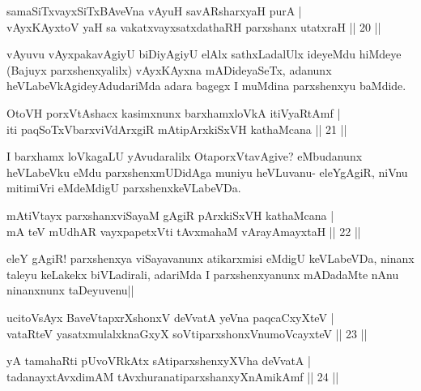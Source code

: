 
\begin{shl}
samaSiTxvayxSiTxBAveVna vAyuH savARsharxyaH purA |\\
vAyxKAyxtoV yaH sa vakatxvayxsatxdathaRH parxshanx utatxraH \hfill || 20 ||
\end{shl}

\begin{artha}
vAyuvu vAyxpakavAgiyU biDiyAgiyU elAlx sathxLadalUlx ideyeMdu hiMdeye (Bajuyx parxshenxyalilx) vAyxKAyxna mADideyaSeTx, adanunx heVLabeVkAgideyA\-dudariMda adara bagegx I muMdina parxshenxyu baMdide.
\end{artha}

\begin{shl}
OtoVH porxVtAshacx kasimxnunx barxhamxloVkA itiVyaRtAmf |\\
iti paqSoTxV\s barxviVdArxgiR mA\s tipArxkiSxVH kathaMcana \hfill || 21 ||
\end{shl}

\begin{artha}
I barxhamx loVkagaLU yAvudaralilx OtaporxVtavAgive? eMbudanunx heVLabeVku eMdu parxshenxmUDidAga muniyu heVLuvanu- eleYgAgiR, niVnu mitimiVri eMdeMdigU parxshenxkeVLabeVDa.
\end{artha}


\begin{shl}
mA\s tiVtayx parxshanxviSayaM gAgiR pArxkiSxVH kathaMcana |\\
mA teV mUdhAR vayxpapetxVti tAvxmahaM vArayAmayxtaH \hfill || 22 ||
\end{shl}

\begin{artha}
eleY gAgiR! parxshenxya viSayavanunx atikarxmisi eMdigU keVLabeVDa, ninanx taleyu keLakekx biVLadirali, adariMda I parxshenxyanunx mADadaMte nAnu ninanxnunx taDeyuvenu||
\end{artha}


\begin{shl}
ucitoV\s sAyx BaveVtapxrXshonxV deVvatA yeVna paqcaCxyXteV |\\
vataRteV yasatxmulalxknaGxyX soV\s tiparxshonxV\s numoVcayxteV \hfill || 23 ||
\end{shl}

\begin{shl}
yA tamahaRti pUvoVRkAtx sA\s tiparxshenxyXVha deVvatA |\\
tadanayxtAvxdimAM tAvxhuranatiparxshanxyXnAmikAmf \hfill || 24 ||
\end{shl}

